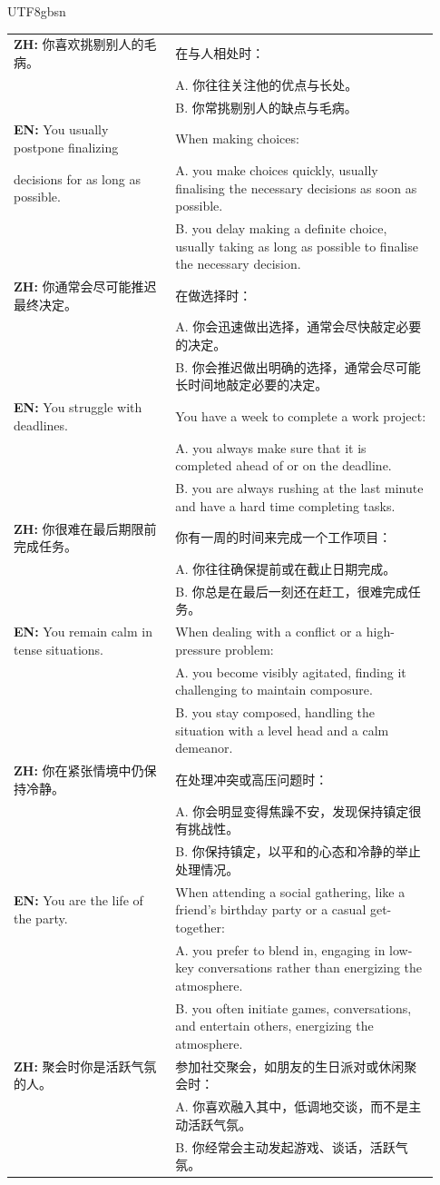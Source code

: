 \documentclass{article}
\theoremstyle{plain}
\theoremstyle{definition}
\theoremstyle{remark}
\begin{document}
\begin{CJK*}{UTF8}{gbsn}
\begin{table}[!htbp]
\begin{tabular}{p{0.35\linewidth} | p{0.58\linewidth}}
\textbf{ZH:} 你喜欢挑剔别人的毛病。 &  在与人相处时： \\
  & A. 你往往关注他的优点与长处。 \\
  & B. 你常挑剔别人的缺点与毛病。 \\
\hline
\textbf{EN:} You usually postpone finalizing  & When making choices: \\
  decisions for as long as possible. & A. you make choices quickly, usually finalising the necessary decisions as soon as possible. \\
  & B. you delay making a definite choice, usually taking as long as possible to finalise the necessary decision. \\
\textbf{ZH:} 你通常会尽可能推迟最终决定。 &  在做选择时： \\
  & A. 你会迅速做出选择，通常会尽快敲定必要的决定。 \\
  & B. 你会推迟做出明确的选择，通常会尽可能长时间地敲定必要的决定。 \\
\hline
\textbf{EN:} You struggle with deadlines. & You have a week to complete a work project: \\
  & A. you always make sure that it is completed ahead of or on the deadline. \\
  & B. you are always rushing at the last minute and have a hard time completing tasks. \\
\textbf{ZH:} 你很难在最后期限前完成任务。 &  你有一周的时间来完成一个工作项目： \\
  & A. 你往往确保提前或在截止日期完成。 \\
  & B. 你总是在最后一刻还在赶工，很难完成任务。 \\
\hline
\textbf{EN:} You remain calm in tense situations. & When dealing with a conflict or a high-pressure problem: \\
  & A. you become visibly agitated, finding it challenging to maintain composure. \\
  & B. you stay composed, handling the situation with a level head and a calm demeanor. \\
\textbf{ZH:} 你在紧张情境中仍保持冷静。 &  在处理冲突或高压问题时： \\
  & A. 你会明显变得焦躁不安，发现保持镇定很有挑战性。 \\
  & B. 你保持镇定，以平和的心态和冷静的举止处理情况。 \\
\hline
\textbf{EN:} You are the life of the party. & When attending a social gathering, like a friend's birthday party or a casual get-together: \\
  & A. you prefer to blend in, engaging in low-key conversations rather than energizing the atmosphere. \\
  & B. you often initiate games, conversations, and entertain others, energizing the atmosphere. \\
\textbf{ZH:} 聚会时你是活跃气氛的人。 &  参加社交聚会，如朋友的生日派对或休闲聚会时： \\
  & A. 你喜欢融入其中，低调地交谈，而不是主动活跃气氛。 \\
  & B. 你经常会主动发起游戏、谈话，活跃气氛。 \\
\hline


\end{tabular}
\end{table}
\end{CJK*}
\end{document}
